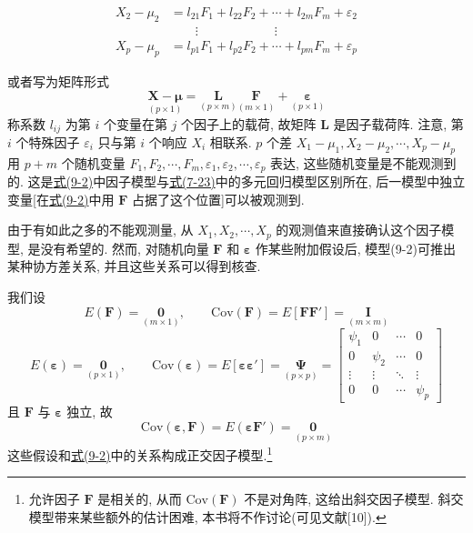 
\label{eq:9-1}
\begin{equation}
\begin{aligned}
X_2-\mu_2 &= l_{21}F_1+l_{22}F_2+\cdots+l_{2m}F_m+\varepsilon_2\\
&\qquad\vdots\qquad\qquad\qquad\vdots\\
X_p-\mu_p &= l_{p1}F_1+l_{p2}F_2+\cdots+l_{pm}F_m+\varepsilon_p
\end{aligned}
\tag{9-1}
\end{equation}

或者写为矩阵形式
\label{eq:9-2}
\begin{equation}
\underset{(p\times1)}{\mathbf{X}-\boldsymbol{\mu}}=\underset{(p\times m)}{\mathbf{L}}\underset{(m\times1)}{\mathbf{F}}+\underset{(p\times1)}{\boldsymbol{\varepsilon}}
\tag{9-2}
\end{equation}
称系数 $l_{ij}$ 为第 $i$ 个变量在第 $j$ 个因子上的载荷, 故矩阵 $\mathbf{L}$ 是因子载荷阵. 注意, 第 $i$ 个特殊因子 $\varepsilon_i$ 只与第 $i$ 个响应 $X_i$ 相联系. $p$ 个差 $X_1-\mu_1,X_2-\mu_2,\cdots,X_p-\mu_p$ 用 $p+m$ 个随机变量 $F_1,F_2,\cdots,F_m,\varepsilon_1,\varepsilon_2,\cdots,\varepsilon_p$ 表达, 这些随机变量是不能观测到的. 这是\hyperref[eq:9-2]{式(9-2)}中因子模型与\hyperref[eq:7-23]{式(7-23)}中的多元回归模型区别所在, 后一模型中独立变量[在\hyperref[eq:9-2]{式(9-2)}中用 $\mathbf{F}$ 占据了这个位置]可以被观测到.

由于有如此之多的不能观测量, 从 $X_1,X_2,\cdots,X_p$ 的观测值来直接确认这个因子模型, 是没有希望的. 然而, 对随机向量 $\mathbf{F}$ 和 $\boldsymbol{\varepsilon}$ 作某些附加假设后, 模型(9-2)可推出某种协方差关系, 并且这些关系可以得到核查.

我们设
\[
E(\mathbf{F})=\underset{(m\times1)}{\mathbf{0}},\qquad
\mathrm{Cov}(\mathbf{F})=E[\mathbf{F}\mathbf{F}']=\underset{(m\times m)}{\mathbf{I}}
\]
\label{eq:9-3}
\begin{equation}
E(\boldsymbol{\varepsilon})=\underset{(p\times1)}{\mathbf{0}},\qquad
\mathrm{Cov}(\boldsymbol{\varepsilon})=E[\boldsymbol{\varepsilon}\boldsymbol{\varepsilon}']=\underset{(p\times p)}{\boldsymbol{\Psi}}
=\begin{bmatrix}
\psi_1&0&\cdots&0\\
0&\psi_2&\cdots&0\\
\vdots&\vdots&\ddots&\vdots\\
0&0&\cdots&\psi_p
\end{bmatrix}
\tag{9-3}
\end{equation}
且 $\mathbf{F}$ 与 $\boldsymbol{\varepsilon}$ 独立, 故
\[
\mathrm{Cov}(\boldsymbol{\varepsilon},\mathbf{F})=E(\boldsymbol{\varepsilon}\mathbf{F}')=\underset{(p\times m)}{\mathbf{0}}
\]
这些假设和\hyperref[eq:9-2]{式(9-2)}中的关系构成正交因子模型.\footnote{允许因子 $\mathbf{F}$ 是相关的, 从而 $\mathrm{Cov}(\mathbf{F})$ 不是对角阵, 这给出斜交因子模型. 斜交模型带来某些额外的估计困难, 本书将不作讨论(可见文献[10]).}

